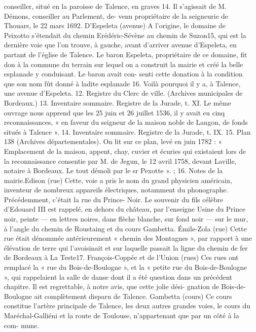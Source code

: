 \documentclass[a4paper,11pt]{book}
\begin{document}
conseiller, situé en la paroisse de Talence, en graves 14.
Il s'agissait de M. Démons, conseiller au Parlement, de-
venu propriétaire de la seigneurie de Thouars, le 22 mars
1692.
D'Espeleta (avenue)
A l'origine, le domaine de Peixotto s'étendait du chemin
Erédéric-Sévène au chemin de Suzon15, qui est la dernière
voie que l'on trouve, à gauche, avant d'arriver avenue
d'Espeleta, en partant de l'église de Talence.
Le baron Espeleta, propriétaire de ce domaine, fit don
à la commune du terrain sur lequel on a construit la mairie
et créé la belle esplanade y conduisant. Le baron avait con-
senti cette donation à la condition que son nom fût donné
à ladite esplanade 16. Voilà pourquoi il y a, à Talence, une
avenue d'Espeleta.
12. Registre du Clerc de ville. (Archives municipales de Bordeaux.)
13. Inventaire sommaire. Registre de la Jurade, t. XI.
Le même ouvrage nous apprend que les 25 juin et 26 juillet 1536, il y
avait eu cinq reconnaissances, « en faveur du seigneur de la maison
noble de Langon, de fonds situés à Talence ».
14. Inventaire sommaire. Registre de la Jurade, t. IX.
15. Plan 138 (Archives départementales). On lit sur ce plan, levé en
juin 1782 : « Emplacement de la maison, appent, chay, cuvier et écuries
qui existaient lors de la reconnaissance consentie par M. de Jegun, le
12 avril 1758, devant Laville, notaire à Bordeaux. Le tout démoli par le
sr Pexotte ».
;
16. Notes de la mairie.Edison (rue)
Cette, voie a pris le nom du grand physicien américain,
inventeur de nombreux appareils électriques, notamment
du phonographe. Précédemment, c'était la rue du Prince-
Noir.
Le souvenir du fils célèbre d'Edouard III est rappelé,
en dehors du château, par l'enseigne Usine du Prince noir,
peinte — en lettres noires, dans flèche blanche, sur fond
noir — sur le mur, à l'angle du chemin de Roustaing et du
cours Gambetta.
Émile-Zola (rue)
Cette rue était dénommée antérieurement « chemin des
Montagnes », par rapport à une élévation de terre qui
l'avoisinait et sur laquelle passait la ligne du chemin de fer
de Bordeaux à La Teste17.
François-Coppée et de l'Union (rues)
Ces rues ont remplacé la « rue du Bois-de-Boulogne »,
et la « petite rue du Bois-de-Boulogne », qui rappelaient
la salle de danse dont il a été question dans un précédent
chapitre. Il est regrettable, à notre avis, que cette jolie dési-
gnation de Bois-de-Boulogne ait complètement disparu de
Talence.
Gambetta (cours)
Ce cours constitue l'artère principale de Talence, les deux
autres grandes voies, le cours du Maréchal-Galliéni et la
route de Toulouse, n'appartenant que par un côté à la com-
mune.
\end{document}
